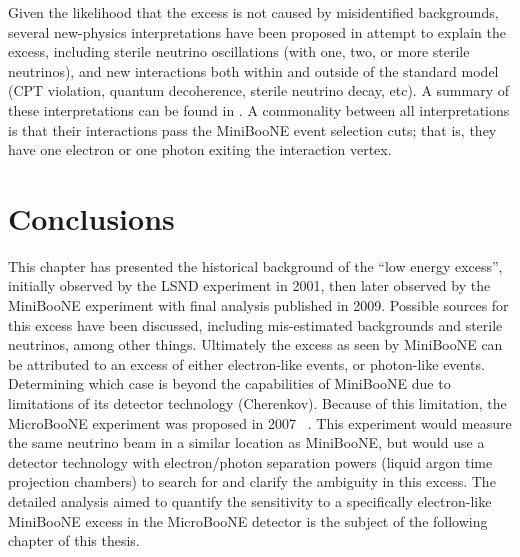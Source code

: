 Given the likelihood that the excess is not caused by misidentified backgrounds, several new-physics interpretations have been proposed in attempt to explain the excess, including sterile neutrino oscillations (with one, two, or more sterile neutrinos), and new interactions both within and outside of the standard model (CPT violation, quantum decoherence, sterile neutrino decay, etc). A summary of these interpretations can be found in \cite{MBLEESourcesOverview}. A commonality between all interpretations is that their interactions pass the MiniBooNE event selection cuts; that is, they have one electron or one photon exiting the interaction vertex.\\

\section{Conclusions}
This chapter has presented the historical background of the ``low energy excess'', initially observed by the LSND experiment in 2001, then later observed by the MiniBooNE experiment with final analysis published in 2009. Possible sources for this excess have been discussed, including mis-estimated backgrounds and sterile neutrinos, among other things. Ultimately the excess as seen by MiniBooNE can be attributed to an excess of either electron-like events, or photon-like events. Determining which case is beyond the capabilities of MiniBooNE due to limitations of its detector technology (Cherenkov). Because of this limitation, the MicroBooNE experiment was proposed in 2007 ~\cite{MicroBooNEProposal}. This experiment would measure the same neutrino beam in a similar location as MiniBooNE, but would use a detector technology with electron/photon separation powers (liquid argon time projection chambers) to search for and clarify the ambiguity in this excess. The detailed analysis aimed to quantify the sensitivity to a specifically electron-like MiniBooNE excess in the MicroBooNE detector is the subject of the following chapter of this thesis.